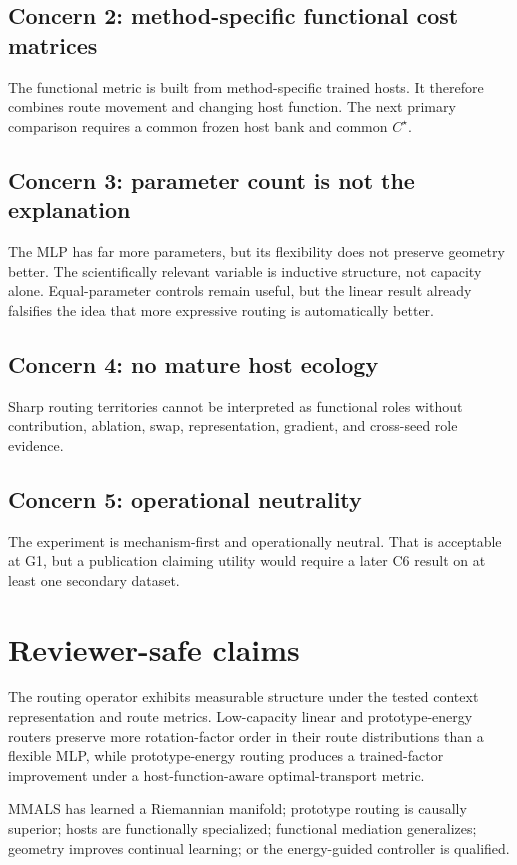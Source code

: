 \documentclass[11pt,a4paper]{article}
\begin{document}
\subsection{Concern 2: method-specific functional cost matrices}
The functional metric is built from method-specific trained hosts. It therefore combines route movement and changing host function. The next primary comparison requires a common frozen host bank and common $C^\star$.

\subsection{Concern 3: parameter count is not the explanation}
The MLP has far more parameters, but its flexibility does not preserve geometry better. The scientifically relevant variable is inductive structure, not capacity alone. Equal-parameter controls remain useful, but the linear result already falsifies the idea that more expressive routing is automatically better.

\subsection{Concern 4: no mature host ecology}
Sharp routing territories cannot be interpreted as functional roles without contribution, ablation, swap, representation, gradient, and cross-seed role evidence.

\subsection{Concern 5: operational neutrality}
The experiment is mechanism-first and operationally neutral. That is acceptable at G1, but a publication claiming utility would require a later C6 result on at least one secondary dataset.

\section{Reviewer-safe claims}
\begin{plainbox}[Acceptable]
The routing operator exhibits measurable structure under the tested context representation and route metrics. Low-capacity linear and prototype-energy routers preserve more rotation-factor order in their route distributions than a flexible MLP, while prototype-energy routing produces a trained-factor improvement under a host-function-aware optimal-transport metric.
\end{plainbox}
\begin{criticalbox}
MMALS has learned a Riemannian manifold; prototype routing is causally superior; hosts are functionally specialized; functional mediation generalizes; geometry improves continual learning; or the energy-guided controller is qualified.
\end{criticalbox}
\end{document}
